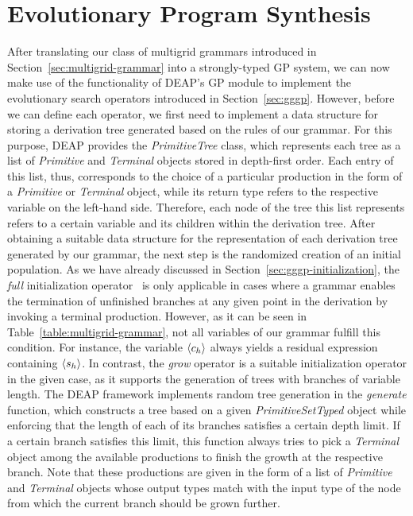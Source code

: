 \section{Evolutionary Program Synthesis}
After translating our class of multigrid grammars introduced in Section~\ref{sec:multigrid-grammar} into a strongly-typed GP system, we can now make use of the functionality of DEAP's GP module to implement the evolutionary search operators introduced in Section~\ref{sec:gggp}.
However, before we can define each operator, we first need to implement a data structure for storing a derivation tree generated based on the rules of our grammar.
For this purpose, DEAP provides the \emph{PrimitiveTree} class, which represents each tree as a list of \emph{Primitive} and \emph{Terminal} objects stored in depth-first order.
Each entry of this list, thus, corresponds to the choice of a particular production in the form of a \emph{Primitive} or \emph{Terminal} object, while its return type refers to the respective variable on the left-hand side.
Therefore, each node of the tree this list represents refers to a certain variable and its children within the derivation tree.
After obtaining a suitable data structure for the representation of each derivation tree generated by our grammar, the next step is the randomized creation of an initial population.
As we have already discussed in Section~\ref{sec:gggp-initialization}, the \emph{full} initialization operator~\cite{koza1994genetic,poli2008field} is only applicable in cases where a grammar enables the termination of unfinished branches at any given point in the derivation by invoking a terminal production.
However, as it can be seen in Table~\ref{table:multigrid-grammar}, not all variables of our grammar fulfill this condition.
For instance, the variable $\langle c_h \rangle$ always yields a residual expression containing $\langle s_h \rangle$.
In contrast, the \emph{grow} operator is a suitable initialization operator in the given case, as it supports the generation of trees with branches of variable length. 
The DEAP framework implements random tree generation in the \emph{generate} function, which constructs a tree based on a given \emph{PrimitiveSetTyped} object while enforcing that the length of each of its branches satisfies a certain depth limit.
If a certain branch satisfies this limit, this function always tries to pick a \emph{Terminal} object among the available productions to finish the growth at the respective branch. 
Note that these productions are given in the form of a list of \emph{Primitive} and \emph{Terminal} objects whose output types match with the input type of the node from which the current branch should be grown further.
